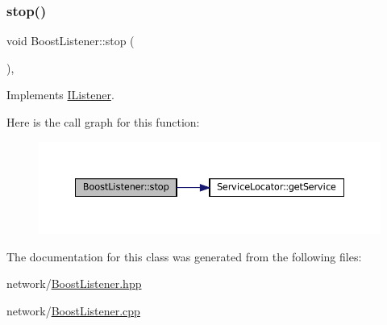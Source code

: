 \subsubsection{\texorpdfstring{stop()}{stop()}}
{\footnotesize\ttfamily void Boost\+Listener\+::stop (\begin{DoxyParamCaption}{ }\end{DoxyParamCaption})\hspace{0.3cm}{\ttfamily [override]}, {\ttfamily [virtual]}}



Implements \mbox{\hyperlink{classIListener_a288f3ad930bc90086f4e8b6578609366}{I\+Listener}}.

Here is the call graph for this function\+:
\nopagebreak
\begin{figure}[H]
\begin{center}
\leavevmode
\includegraphics[width=350pt]{classBoostListener_af83620fe2b6644903a6f631b8df2fd2d_cgraph}
\end{center}
\end{figure}


The documentation for this class was generated from the following files\+:\begin{DoxyCompactItemize}
\item 
network/\mbox{\hyperlink{BoostListener_8hpp}{Boost\+Listener.\+hpp}}\item 
network/\mbox{\hyperlink{BoostListener_8cpp}{Boost\+Listener.\+cpp}}\end{DoxyCompactItemize}
